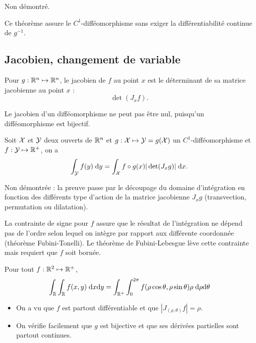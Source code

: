 \proof Non démontré. \eproof

\remark
Ce théorème assure le $C^1$-difféomorphisme sans exiger la différentiabilité continue de $g^{-1}$.

\subsection{Jacobien, changement de variable}

\begin{definition*}[Jacobien]
  Pour $g : \mathbb{R}^n \mapsto \mathbb{R}^n$, le jacobien de $f$ au point $x$ est le déterminant de sa matrice jacobienne au point $x$ : 
  $$
  \det(J_x f).
  $$
\end{definition*}

\remark
Le jacobien d'un difféomorphisme ne peut pas être nul, puisqu'un difféomorphisme est bijectif.

\begin{theorem*}
  Soit $\mathcal{X}$ et $\mathcal{Y}$ deux ouverts de $\mathbb{R}^n$ et $g : \mathcal{X} \mapsto \mathcal{Y} = g(\mathcal{X})$ un $C^1$-difféomorphisme et $f : \mathcal{Y} \mapsto \mathbb{R}^+$, on a 
  $$
  \int_{\mathcal{Y}} f(y) \; \text{d} y = \int_{\mathcal{X}} f \circ g(x) |\det(J_x g)| \; \text{d} x.
  $$
\end{theorem*}

\proof
Non démontrée : la preuve passe par le découpage du domaine d'intégration en fonction des différents type d'action de la matrice jacobienne $J_x g$ (transvection, permutation ou
dilatation).
\eproof

\remark
La contrainte de signe pour $f$ assure que le résultat de l'intégration ne dépend pas de l'ordre selon lequel on intègre par rapport aux différente coordonnée (théorème Fubini-Tonelli). Le théorème de Fubini-Lebesgue lève cette contrainte mais requiert que $f$ soit bornée.

\begin{corollary*}
  Pour tout $f : \mathbb{R}^2 \mapsto \mathbb{R}^+$, 
  $$
  \int_{\mathbb{R}} \int_{\mathbb{R}} f(x, y) \; \text{d} x \text{d} y
  = \int_{\mathbb{R}^+} \int_0^{2 \pi} f(\rho \cos \theta, \rho \sin \theta) \rho \; \text{d} \rho \text{d} \theta
  $$
\end{corollary*}

\proof
\begin{itemize}
  \item On a vu que $f$ est partout différentiable et que $|J_{(\rho, \theta)}f| = \rho$.
  \item On vérifie facilement que $g$ est bijective et que ses dérivées partielles sont partout continues.
\end{itemize}
\eproof

